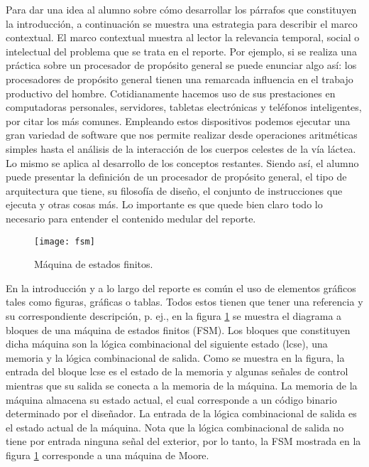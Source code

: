 \documentclass[10pt, twocolumn]{article}
\begin{document}
Para dar una idea al alumno sobre cómo desarrollar los párrafos que constituyen la introducción, a continuación se muestra una estrategia para describir el marco contextual. El marco contextual muestra al lector la relevancia temporal, social o intelectual del problema que se trata en el reporte. Por ejemplo, si se realiza una práctica sobre un procesador de propósito general se puede enunciar algo así: los procesadores de propósito general tienen una remarcada influencia en el trabajo productivo del hombre. Cotidianamente hacemos uso de sus prestaciones en computadoras personales, servidores, tabletas electrónicas y teléfonos inteligentes, por citar los más comunes. Empleando estos dispositivos podemos ejecutar una gran variedad de software que nos permite realizar desde operaciones aritméticas simples hasta el análisis de la interacción de los cuerpos celestes de la vía láctea. Lo mismo se aplica al desarrollo de los conceptos restantes. Siendo así, el alumno puede presentar la definición de un procesador de propósito general, el tipo de arquitectura que tiene, su filosofía de diseño, el conjunto de instrucciones que ejecuta y otras cosas más. Lo importante es que quede bien claro todo lo necesario para entender el contenido medular del reporte.

\begin{figure}[t] %
    \centering
    \texttt{[image: fsm]}
    \caption{Máquina de estados finitos.}
    \label{fig:fsm}
\end{figure}

En la introducción y a lo largo del reporte es común el uso de elementos gráficos tales como figuras, gráficas o tablas. Todos estos tienen que tener una referencia y su correspondiente descripción, p. ej., en la figura \ref{fig:fsm} se muestra el diagrama a bloques de una máquina de estados finitos (FSM). Los bloques que constituyen dicha máquina son la lógica combinacional del siguiente estado (lcse), una memoria y la lógica combinacional de salida. Como se muestra en la figura, la entrada del bloque lcse es el estado de la memoria y algunas señales de control mientras que su salida se conecta a la memoria de la máquina. La memoria de la máquina almacena su estado actual, el cual corresponde a un código binario determinado por el diseñador. La entrada de la lógica combinacional de salida es el estado actual de la máquina. Nota que la lógica combinacional de salida no tiene por entrada ninguna señal del exterior, por lo tanto, la FSM mostrada en la figura \ref{fig:fsm} corresponde a una máquina de Moore.
\end{document}
